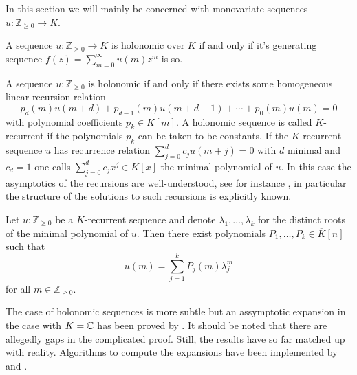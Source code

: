     In this section we will mainly be concerned with monovariate sequences $u:\mathbb{Z}_{\geq 0}\to K$.
    \begin{theorem}{\cite[Theorem 1.5]{stanley1980differentiably}}\label{thm: GeneratingFunction}
      A sequence $u:\mathbb{Z}_{\geq 0}\to K$ is holonomic over $K$ if and only if it's generating sequence $f(z) = \sum_{m=0}^{\infty} u(m)z^m$ is so.
    \end{theorem}
    A sequence $u:\mathbb{Z}_{\geq 0}$ is holonomic if and only if there exists some homogeneous linear recursion relation
    $$p_d(m)u(m+d) + p_{d-1}(m)u(m+d-1) + \cdots + p_0(m)u(m) = 0 $$
    with polynomial coefficients $p_k \in K[m]$.
    A holonomic sequence is called $K$-recurrent if the polynomials $p_k$ can be taken to be constants.
    If the $K$-recurrent sequence $u$ has recurrence relation $\sum_{j=0}^d c_{j}u(m+j)= 0$ with $d$ minimal and $c_d = 1$ one calls $\sum_{j=0}^d c_jx^j\in K[x]$ the minimal polynomial of $u$.
    In this case the asymptotics of the recursions are well-understood, see for instance \cite[Chapter 2]{everest2003recurrence}, in particular the structure of the solutions to such recursions is explicitly known.
    \begin{theorem}{\cite[Theorem 1.6]{nobleAsymptotics}}
      Let $u:\mathbb{Z}_{\geq 0}$ be a $K$-recurrent sequence and denote $\lambda_1,\ldots,\lambda_k$ for the distinct roots of the minimal polynomial of $u$.
      Then there exist polynomials $P_1,\ldots,P_k \in \overline{K}[n]$ such that
      $$u(m) = \sum_{j=1}^k P_j(m)\lambda_j^m$$
      for all $m\in \mathbb{Z}_{\geq 0}$.
    \end{theorem}
    The case of holonomic sequences is more subtle but an assymptotic expansion in the case with $K = \mathbb{C}$ has been proved by \cite{birkhoff1933analytic}.
    It should be noted that there are allegedly gaps in the complicated proof.
    Still, the results have so far matched up with reality.
    Algorithms to compute the expansions have been implemented by \cite{kauers2011mathematica} and \cite{zeilberger1990holonomic}.

